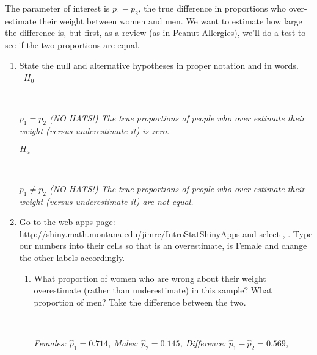   The parameter of interest is $p_1 - p_2$, the true difference in
  proportions who over-estimate their weight between women and men. 
  We want to estimate how large the difference is, but first, as a
  review (as in Peanut Allergies), we'll do a test to see if the two
  proportions are equal. 
  \vspace{-.2in}
  \begin{enumerate}

  \item  State the null and alternative hypotheses in proper notation
    and in words.\\ \ 
    $H_0$
\begin{students}
 \ \   \vspace{1cm}\\
\end{students}
\begin{key}
  {\it $p_1 = p_2$  (NO HATS!) The true proportions of people who over
    estimate their weight (versus underestimate it) is zero.}
    \\
\end{key}
    $H_a$
\begin{students}
 \ \   \vspace{1cm}\\
\end{students}
\begin{key}
  {\it $p_1 \neq p_2$  (NO HATS!) The true proportions of people who over
    estimate their weight (versus underestimate it) are not equal. 
    } \\
\end{key}
    \item \label{testWeight}
   Go to the  web apps page:
   \url{http://shiny.math.montana.edu/jimrc/IntroStatShinyApps}
   and select , .  Type our numbers into
   their cells so that \fbox{Success} is an overestimate,  \fbox{Group 1} is
   Female and change the other labels accordingly.  
   \begin{enumerate}
     \item \label{refWeights} What proportion of women who are wrong
       about their weight overestimate  (rather than underestimate) in this
       sample?  What proportion of men?  Take 
       the difference between the two. 
\begin{students}
 \ \   \vspace*{2cm}\\
\end{students}
\begin{key}
  {\it Females: $\widehat{p}_1 = 0.714$, Males: $\widehat{p}_2 =
    0.145$,  Difference: $\widehat{p}_1  - \widehat{p}_2 =    0.569$,
    } 
\end{key}


\end{enumerate}
\end{enumerate}
